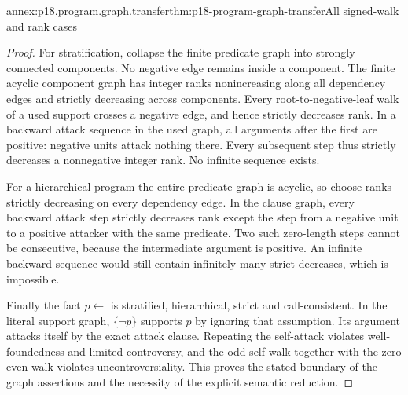 \begin{annexitem}{annex:p18.program.graph.transfer}{thm:p18-program-graph-transfer}{All signed-walk and rank cases}
\begin{proof}
For stratification, collapse the finite
predicate graph into strongly connected
components. No negative edge remains
inside a component. The finite acyclic
component graph has integer ranks
nonincreasing along all dependency
edges and strictly decreasing across
components. Every root-to-negative-leaf
walk of a used support crosses a
negative edge, and hence strictly
decreases rank. In a backward attack
sequence in the used graph, all
arguments after the first are positive:
negative units attack nothing there.
Every subsequent step thus strictly
decreases a nonnegative integer rank.
No infinite sequence exists.

For a hierarchical program the entire
predicate graph is acyclic, so choose
ranks strictly decreasing on every
dependency edge. In the clause graph,
every backward attack step strictly
decreases rank except the step from
a negative unit to a positive attacker
with the same predicate. Two such
zero-length steps cannot be consecutive,
because the intermediate argument is
positive. An infinite backward sequence
would still contain infinitely many
strict decreases, which is impossible.

Finally the fact \(p\leftarrow\) is
stratified, hierarchical, strict and
call-consistent. In the literal support
graph, \(\{\neg p\}\) supports \(p\)
by ignoring that assumption. Its
argument attacks itself by the exact
attack clause. Repeating the self-attack
violates well-foundedness and limited
controversy, and the odd self-walk
together with the zero even walk
violates uncontroversiality. This proves
the stated boundary of the graph
assertions and the necessity of the
explicit semantic reduction.
\end{proof}
\end{annexitem}


